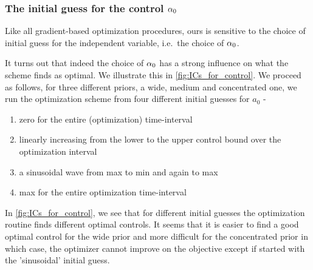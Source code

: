 \documentclass{article}
\begin{document}
\subsubsection{The initial guess for the control ${\alpha}_0$}
Like all gradient-based optimization procedures, ours is sensitive to the choice
of initial guess for the independent variable, i.e.\ the choice of ${\alpha}_0$. 

It turns out that indeed the choice of ${\alpha}_0$ has a strong influence on what the
scheme finds as optimal. We illustrate this in \cref{fig:ICs_for_control}. We
proceed as follows, for three different priors, a wide, medium and concentrated
one, we run the optimization scheme from four different initial guesses for
$a_0$ - 
\begin{enumerate}
\item zero for the entire (optimization) time-interval
\item linearly increasing from the lower to the upper control bound over the
optimization interval
\item a sinusoidal wave from max to min and again to max
\item max for the entire optimization time-interval 
\end{enumerate}
In \cref{fig:ICs_for_control}, we see that for different initial guesses the
optimization routine finds different optimal controls. It seems that it is
easier to find a good optimal control for the wide prior and more difficult for
the concentrated prior in which case, the optimizer cannot improve on the
objective except if started with the 'sinusoidal' initial guess.
\end{document}
